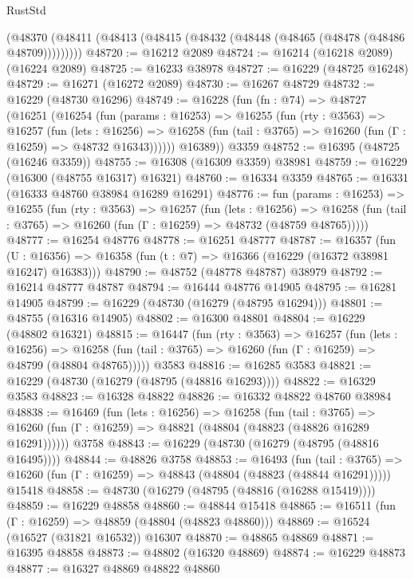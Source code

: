 \begin{lexlean}{RustStd}
\begin{coremodule}
    (@48370 (@48411 (@48413 (@48415 (@48432 (@48448 (@48465 (@48478 (@48486 @48709)))))))))
@48720 := @16212 @2089
@48724 := @16214 (@16218 @2089) (@16224 @2089)
@48725 := @16233 @38978
@48727 := @16229 (@48725 @16248)
@48729 := @16271 (@16272 @2089)
@48730 := @16267 @48729
@48732 := @16229 (@48730 @16296)
@48749 := @16228
    (fun (fn : @74) =>
    @48727
      (@16251
        (@16254
          (fun (params : @16253) =>
          @16255
            (fun (rty : @3563) =>
            @16257
              (fun (lets : @16256) =>
              @16258 (fun (tail : @3765) => @16260 (fun (Γ : @16259) => @48732 @16343))))))
        @16389))
    @3359
@48752 := @16395 (@48725 (@16246 @3359))
@48755 := @16308 (@16309 @3359) @38981
@48759 := @16229 (@16300 (@48755 @16317) @16321)
@48760 := @16334 @3359
@48765 := @16331 (@16333 @48760 @38984 @16289 @16291)
@48776 := fun (params : @16253) =>
  @16255
    (fun (rty : @3563) =>
    @16257
      (fun (lets : @16256) =>
      @16258 (fun (tail : @3765) => @16260 (fun (Γ : @16259) => @48732 (@48759 @48765)))))
@48777 := @16254 @48776
@48778 := @16251 @48777
@48787 := @16357
    (fun (U : @16356) => @16358 (fun (t : @7) => @16366 (@16229 (@16372 @38981 @16247) @16383)))
@48790 := @48752 (@48778 @48787) @38979
@48792 := @16214 @48777 @48787
@48794 := @16444 @48776 @14905
@48795 := @16281 @14905
@48799 := @16229 (@48730 (@16279 (@48795 @16294)))
@48801 := @48755 (@16316 @14905)
@48802 := @16300 @48801
@48804 := @16229 (@48802 @16321)
@48815 := @16447
    (fun (rty : @3563) =>
    @16257
      (fun (lets : @16256) =>
      @16258 (fun (tail : @3765) => @16260 (fun (Γ : @16259) => @48799 (@48804 @48765)))))
    @3583
@48816 := @16285 @3583
@48821 := @16229 (@48730 (@16279 (@48795 (@48816 @16293))))
@48822 := @16329 @3583
@48823 := @16328 @48822
@48826 := @16332 @48822 @48760 @38984
@48838 := @16469
    (fun (lets : @16256) =>
    @16258
      (fun (tail : @3765) =>
      @16260 (fun (Γ : @16259) => @48821 (@48804 (@48823 (@48826 @16289 @16291))))))
    @3758
@48843 := @16229 (@48730 (@16279 (@48795 (@48816 @16495))))
@48844 := @48826 @3758
@48853 := @16493
    (fun (tail : @3765) => @16260 (fun (Γ : @16259) => @48843 (@48804 (@48823 (@48844 @16291)))))
    @15418
@48858 := @48730 (@16279 (@48795 (@48816 (@16288 @15419))))
@48859 := @16229 @48858
@48860 := @48844 @15418
@48865 := @16511 (fun (Γ : @16259) => @48859 (@48804 (@48823 @48860)))
@48869 := @16524 (@16527 (@31821 @16532)) @16307
@48870 := @48865 @48869
@48871 := @16395 @48858
@48873 := @48802 (@16320 @48869)
@48874 := @16229 @48873
@48877 := @16327 @48869 @48822 @48860

\end{coremodule}
\end{lexlean}
